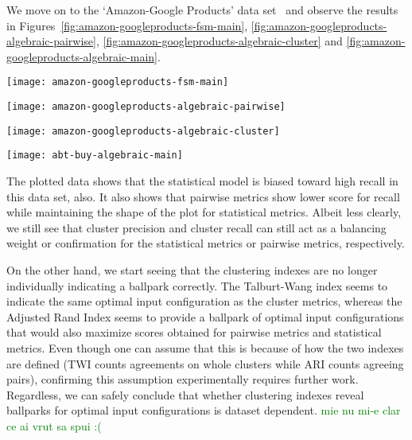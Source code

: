 We move on to the `Amazon-Google Products' data set~\cite{vldb2010} and observe
the results in Figures~\ref{fig:amazon-googleproducts-fsm-main},
\ref{fig:amazon-googleproducts-algebraic-pairwise},
\ref{fig:amazon-googleproducts-algebraic-cluster} and
\ref{fig:amazon-googleproducts-algebraic-main}.

\begin{figure*}[h]
    \begin{minipage}{0.24\textwidth}
        \centering
        \texttt{[image: amazon-googleproducts-fsm-main]}
        \caption{Amazon-Google statistical metrics.}
        \label{fig:amazon-googleproducts-fsm-main}
    \end{minipage}
    \begin{minipage}{0.24\textwidth}
        \centering
        \texttt{[image: amazon-googleproducts-algebraic-pairwise]}
        \caption{Amazon-Google pairwise metrics.}
        \label{fig:amazon-googleproducts-algebraic-pairwise}
    \end{minipage}
    \begin{minipage}{0.24\textwidth}
        \centering
        \texttt{[image: amazon-googleproducts-algebraic-cluster]}
        \caption{Amazon-Google cluster metrics.}
        \label{fig:amazon-googleproducts-algebraic-cluster}
    \end{minipage}
    \begin{minipage}{0.24\textwidth}
        \centering
        \texttt{[image: abt-buy-algebraic-main]}
        \caption{Amazon-Google clustering indexes.}
        \label{fig:amazon-googleproducts-algebraic-main}
    \end{minipage}
\end{figure*}\label{amazon-google}

The plotted data shows that the statistical model is biased toward high recall
in this data set, also.
It also shows that pairwise metrics show lower score for recall while
maintaining the shape of the plot for statistical metrics.
Albeit less clearly, we still see that cluster precision and cluster recall can
still act as a balancing weight or confirmation for the statistical metrics or
pairwise metrics, respectively.

On the other hand, we start seeing that the clustering indexes are no longer
individually indicating a ballpark correctly.
The Talburt-Wang index seems to indicate the same optimal input configuration as
the cluster metrics, whereas the Adjusted Rand Index seems to provide a ballpark
of optimal input configurations that would also maximize scores obtained for
pairwise metrics and statistical metrics.
Even though one can assume that this is because of how the two indexes are
defined (TWI counts agreements on whole clusters while ARI counts agreeing
pairs), confirming this assumption experimentally requires further work.
Regardless, we can safely conclude that whether clustering indexes reveal
ballparks for optimal input configurations is dataset dependent.
\textcolor{green}{mie nu mi-e clar ce ai vrut sa spui :(}

